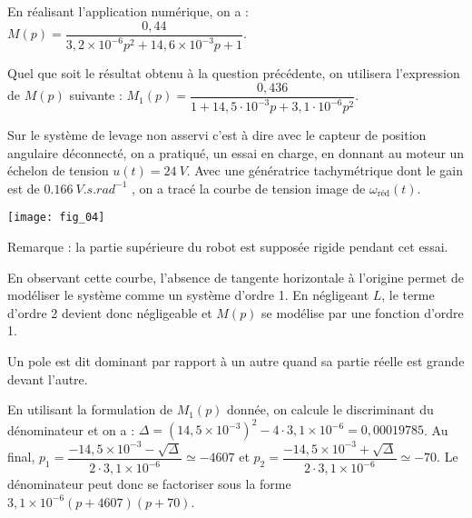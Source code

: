 \begin{multicols}{2}
\begin{corrige}
En réalisant l'application numérique, on a : 
$M(p)=\dfrac{0,44}{  3,2\times 10^{-6} p^2 +14,6\times 10^{-3}p +1 }$.

\end{corrige}
\else
\fi

\ifprof
\else
Quel que soit le résultat obtenu à la question précédente, on utilisera l’expression de $M(p)$ suivante : $M_1(p)=\dfrac{0,436}{1+14,5\cdot 10^{-3}p+3,1\cdot 10^{-6}p^2}$. 

Sur le système de levage non asservi c’est à dire avec le capteur de position angulaire déconnecté, on a pratiqué, un essai en charge, en donnant au moteur un échelon de tension $u(t) = \SI{24}{V}$. 
Avec une génératrice tachymétrique dont le gain est de $\SI{0,166}{V.s.rad^{-1}}$ , on a tracé la courbe de tension image de $\omega_{\text{réd}}(t)$.  

\begin{center}
\texttt{[image: fig\_04]}
\end{center}


Remarque : la partie supérieure du robot est supposée rigide pendant cet essai.
\fi

\ifprof
\begin{corrige}
En observant cette courbe, l'absence de tangente horizontale à l'origine permet de modéliser le système comme un système d'ordre 1.  En négligeant $L$, le terme d'ordre 2 devient donc négligeable et $M(p)$ se modélise par une fonction d'ordre 1. 
\end{corrige}
\else
\fi


\begin{rem}
Un pole est dit dominant par rapport à un autre quand sa partie réelle est grande devant l'autre.
\end{rem}

\ifprof
\begin{corrige}
En utilisant la formulation de $M_1(p)$ donnée, on calcule le discriminant du dénominateur et on a : 
$\Delta = \left(14,5\times 10^{-3}\right)^2 - 4\cdot 3,1 \times 10^{-6} = 0,00019785 $. 
Au final, $p_1 = \dfrac{-14,5\times 10^{-3}-\sqrt{\Delta}}{2\cdot 3,1 \times 10^{-6}}\simeq -4607$ et $p_2 = \dfrac{-14,5\times 10^{-3}+\sqrt{\Delta}}{2\cdot 3,1 \times 10^{-6}}\simeq -70$. 
Le dénominateur peut donc se factoriser sous la forme $ 3,1 \times 10^{-6}\left( p + 4607\right)\left(p+70\right)$.


\end{corrige}
\end{multicols}
